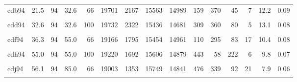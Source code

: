 \begin{landscape}
\begin{ThreePartTable}
\begin{longtable}[t]{lrrrrrrrrrrrrrr}
cdb94 & 21.5 & 94 & 32.6 & 66 & 19701 & 2167 & 15563 & 14989 & 159 & 370 & 45 & 7 & 12.2 & 0.09\\
\cellcolor{gray!6}{cdc94} & \cellcolor{gray!6}{26.1} & \cellcolor{gray!6}{94} & \cellcolor{gray!6}{32.6} & \cellcolor{gray!6}{80} & \cellcolor{gray!6}{19722} & \cellcolor{gray!6}{2116} & \cellcolor{gray!6}{15633} & \cellcolor{gray!6}{15466} & \cellcolor{gray!6}{73} & \cellcolor{gray!6}{37} & \cellcolor{gray!6}{52} & \cellcolor{gray!6}{12} & \cellcolor{gray!6}{11.9} & \cellcolor{gray!6}{0.08}\\
cdd94 & 32.6 & 94 & 32.6 & 100 & 19732 & 2322 & 15436 & 14681 & 309 & 360 & 80 & 5 & 13.1 & 0.08\\
\cellcolor{gray!6}{cde94} & \cellcolor{gray!6}{22.0} & \cellcolor{gray!6}{94} & \cellcolor{gray!6}{55.0} & \cellcolor{gray!6}{40} & \cellcolor{gray!6}{19169} & \cellcolor{gray!6}{1789} & \cellcolor{gray!6}{15463} & \cellcolor{gray!6}{14544} & \cellcolor{gray!6}{77} & \cellcolor{gray!6}{800} & \cellcolor{gray!6}{18} & \cellcolor{gray!6}{4} & \cellcolor{gray!6}{10.4} & \cellcolor{gray!6}{0.15}\\
cdf94 & 36.3 & 94 & 55.0 & 66 & 19166 & 1795 & 15454 & 14961 & 110 & 295 & 83 & 17 & 10.4 & 0.08\\
\cellcolor{gray!6}{cdg94} & \cellcolor{gray!6}{44.0} & \cellcolor{gray!6}{94} & \cellcolor{gray!6}{55.0} & \cellcolor{gray!6}{80} & \cellcolor{gray!6}{19190} & \cellcolor{gray!6}{1789} & \cellcolor{gray!6}{15482} & \cellcolor{gray!6}{14824} & \cellcolor{gray!6}{270} & \cellcolor{gray!6}{249} & \cellcolor{gray!6}{134} & \cellcolor{gray!6}{9} & \cellcolor{gray!6}{10.4} & \cellcolor{gray!6}{0.07}\\
cdh94 & 55.0 & 94 & 55.0 & 100 & 19220 & 1692 & 15606 & 14879 & 443 & 58 & 222 & 6 & 9.8 & 0.07\\
\cellcolor{gray!6}{cdi94} & \cellcolor{gray!6}{34.0} & \cellcolor{gray!6}{94} & \cellcolor{gray!6}{85.0} & \cellcolor{gray!6}{40} & \cellcolor{gray!6}{18996} & \cellcolor{gray!6}{1977} & \cellcolor{gray!6}{15119} & \cellcolor{gray!6}{14295} & \cellcolor{gray!6}{43} & \cellcolor{gray!6}{680} & \cellcolor{gray!6}{101} & \cellcolor{gray!6}{10} & \cellcolor{gray!6}{11.6} & \cellcolor{gray!6}{0.52}\\
cdj94 & 56.1 & 94 & 85.0 & 66 & 19003 & 1353 & 15749 & 14841 & 476 & 339 & 92 & 21 & 7.9 & 0.06\\
\cellcolor{gray!6}{cdk94} & \cellcolor{gray!6}{68.0} & \cellcolor{gray!6}{94} & \cellcolor{gray!6}{85.0} & \cellcolor{gray!6}{80} & \cellcolor{gray!6}{19001} & \cellcolor{gray!6}{1288} & \cellcolor{gray!6}{15812} & \cellcolor{gray!6}{14655} & \cellcolor{gray!6}{670} & \cellcolor{gray!6}{329} & \cellcolor{gray!6}{158} & \cellcolor{gray!6}{17} & \cellcolor{gray!6}{7.5} & \cellcolor{gray!6}{0.06}\\

\end{longtable}
\end{ThreePartTable}
\end{landscape}
